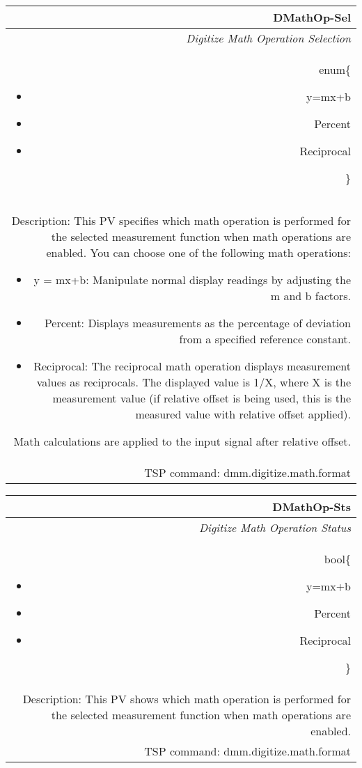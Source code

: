 \documentclass[openany]{article}
\begin{document}
		\begin{tabular}{N}
			\hline
			\bfseries DMathOp-Sel\label{pv:dmathop-sel} \\ \hline
			\emph{Digitize Math Operation Selection} \\
			enum\{\begin{itemize}[noitemsep]
				\small
				\item[] y=mx+b
				\item[] Percent
				\item[] Reciprocal
			\end{itemize}\} \\
			Description: This PV specifies which math operation is performed for the selected measurement function when math operations are enabled. You can choose one of the following math operations: \begin{itemize} \item y = mx+b: Manipulate normal display readings by adjusting the m and b factors. \item Percent: Displays measurements as the percentage of deviation from a specified reference constant. \item Reciprocal: The reciprocal math operation displays measurement values as reciprocals. The displayed value is 1/X, where X is the measurement value (if relative offset is being used, this is the measured value with relative offset applied). \end{itemize} Math calculations are applied to the input signal after relative offset. \\
			TSP command: dmm.digitize.math.format
		\end{tabular}

		\begin{tabular}{N}
			\hline
			\bfseries DMathOp-Sts\label{pv:dmathop-sts} \\ \hline
			\emph{Digitize Math Operation Status} \\
			bool\{\begin{itemize}[noitemsep]
				\small
				\item[] y=mx+b
				\item[] Percent
				\item[] Reciprocal
			\end{itemize}\} \\
			Description: This PV shows which math operation is performed for the selected measurement function when math operations are enabled. \\
			TSP command: dmm.digitize.math.format
		\end{tabular}
\end{document}
